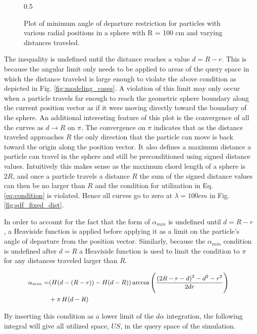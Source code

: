 \begin{figure}
\centering
{0.5\textwidth}
\caption{Plot of minimum angle of departure restriction for particles with
various radial positions in a sphere with R = 100 cm and varying distances traveled.}
\end{figure}

The inequality is undefined until the distance reaches a value $d = R- r$. This
is because the angular limit only needs to be applied to areas of the query
space in which the distance traveled is large enough to violate the above
condition as depicted in Fig. \ref{fig:modeling_cases}. A violation of this
limit may only occur when a particle travels far enough to reach the geometric
sphere boundary along the current position vector as if it were moving directly
toward the boundary of the sphere. An additional interesting feature of this
plot is the convergence of all the curves as $d \rightarrow R$ on $\pi$. The
convergence on $\pi$ indicates that as the distance traveled approaches $R$ the
only direction that the particle can move is back toward the origin along the
position vector. It also defines a maximum distance a particle can travel in the
sphere and still be preconditioned using signed distance values. Intuitively
this makes sense as the maximum chord length of a sphere is $2R$, and once a
particle travels a distance $R$ the sum of the signed distance values can then
be no larger than $R$ and the condition for utilization in Eq. \ref{eq:condition} is
violated. Hence all curves go to zero at $\lambda = 100 cm$ in
Fig. \ref{fig:sdf_fixed_dist}.

In order to account for the fact that the form of $\alpha_{min}$ is undefined
until $d = R-r$, a Heaviside function is applied before applying it as a limit
on the particle's angle of departure from the position vector. Similarly,
because the $\alpha_{min}$ condition is undefined after $d=R$ a Heaviside
function is used to limit the condition to $\pi$ for any distances traveled
larger than $R$.

\begin{equation}
  \small
  \begin{split}
  \alpha_{min} =& (H(d-(R-r))-H(d-R)) \arccos\Bigg ( \frac{(2R-r-d)^2-d^2-r^2}{2 d r} \Bigg ) \\
  &+ \pi \, H(d-R)
  \end{split}
\end{equation}


By inserting this condition as a lower limit of the $d\alpha$ integration, the
following integral will give all utilized space, $US$, in the query space of the
simulation.

